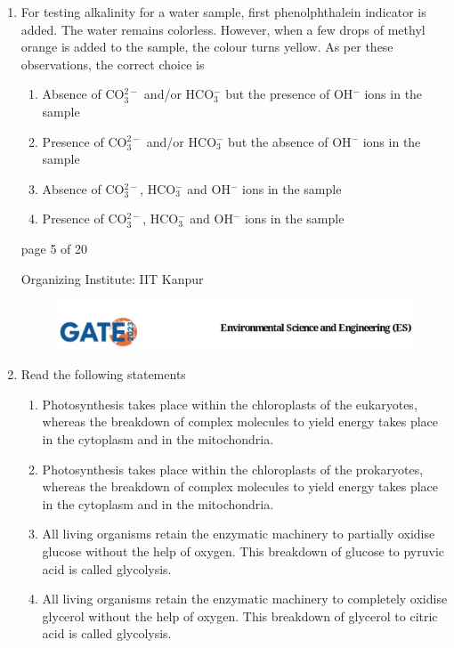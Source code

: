 \documentclass[journal,12pt,onecolumn]{IEEEtran}
\theoremstyle{remark}
\begin{document}
\begin{enumerate}[start=1, label={Q\arabic*.}]
\item For testing alkalinity for a water sample, first phenolphthalein indicator is added. The water remains colorless. However, when a few drops of methyl orange is added to the sample, the colour turns yellow. As per these observations, the correct choice is

\begin{enumerate}[label=(\Alph*)]
\item Absence of CO$_3^{2-}$ and/or HCO$_3^-$ but the presence of OH$^-$ ions in the sample
\item Presence of CO$_3^{2-}$ and/or HCO$_3^-$ but the absence of OH$^-$ ions in the sample
\item Absence of CO$_3^{2-}$, HCO$_3^-$ and OH$^-$ ions in the sample
\item Presence of CO$_3^{2-}$, HCO$_3^-$ and OH$^-$ ions in the sample
\end{enumerate}
\hfill{}
\vfill
\begin{center}
{\Large page 5 of 20}
\end{center}
\RaggedRight
{\color{orange}
{\Large Organizing Institute: IIT Kanpur}}
\newpage
\begin{figure}
    
    \includegraphics[width=1\linewidth]{figs/latex.jpg}
    
\end{figure}
\item Read the following statements

\begin{enumerate}[label=\Roman*.]
\item Photosynthesis takes place within the chloroplasts of the eukaryotes, whereas the breakdown of complex molecules to yield energy takes place in the cytoplasm and in the mitochondria.
\item Photosynthesis takes place within the chloroplasts of the prokaryotes, whereas the breakdown of complex molecules to yield energy takes place in the cytoplasm and in the mitochondria.
\item All living organisms retain the enzymatic machinery to partially oxidise glucose without the help of oxygen. This breakdown of glucose to pyruvic acid is called glycolysis.
\item All living organisms retain the enzymatic machinery to completely oxidise glycerol without the help of oxygen. This breakdown of glycerol to citric acid is called glycolysis.
\end{enumerate}


\end{enumerate}
\end{document}
